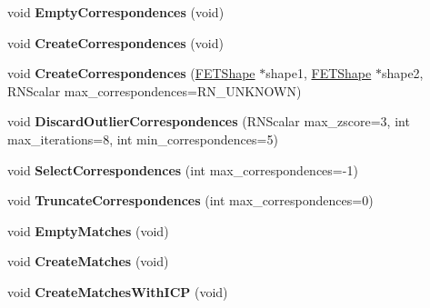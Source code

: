 \begin{DoxyCompactItemize}
\item 
void {\bfseries Empty\+Correspondences} (void)\hypertarget{struct_f_e_t_reconstruction_a63120efc07943fe20129431bf3c66680}{}\label{struct_f_e_t_reconstruction_a63120efc07943fe20129431bf3c66680}

\item 
void {\bfseries Create\+Correspondences} (void)\hypertarget{struct_f_e_t_reconstruction_a179db1cc7528ea562f4af89aa443c6aa}{}\label{struct_f_e_t_reconstruction_a179db1cc7528ea562f4af89aa443c6aa}

\item 
void {\bfseries Create\+Correspondences} (\hyperlink{struct_f_e_t_shape}{F\+E\+T\+Shape} $\ast$shape1, \hyperlink{struct_f_e_t_shape}{F\+E\+T\+Shape} $\ast$shape2, R\+N\+Scalar max\+\_\+correspondences=R\+N\+\_\+\+U\+N\+K\+N\+O\+WN)\hypertarget{struct_f_e_t_reconstruction_affcb77bf4a67b4386bc0b865f9bd4fc6}{}\label{struct_f_e_t_reconstruction_affcb77bf4a67b4386bc0b865f9bd4fc6}

\item 
void {\bfseries Discard\+Outlier\+Correspondences} (R\+N\+Scalar max\+\_\+zscore=3, int max\+\_\+iterations=8, int min\+\_\+correspondences=5)\hypertarget{struct_f_e_t_reconstruction_a910675452ef738b946c9eb438a1b0129}{}\label{struct_f_e_t_reconstruction_a910675452ef738b946c9eb438a1b0129}

\item 
void {\bfseries Select\+Correspondences} (int max\+\_\+correspondences=-\/1)\hypertarget{struct_f_e_t_reconstruction_aaed34442f5b0311c1d4a97bb2f1da822}{}\label{struct_f_e_t_reconstruction_aaed34442f5b0311c1d4a97bb2f1da822}

\item 
void {\bfseries Truncate\+Correspondences} (int max\+\_\+correspondences=0)\hypertarget{struct_f_e_t_reconstruction_ad2167710f8bdae0c65260dd36f7d21a3}{}\label{struct_f_e_t_reconstruction_ad2167710f8bdae0c65260dd36f7d21a3}

\item 
void {\bfseries Empty\+Matches} (void)\hypertarget{struct_f_e_t_reconstruction_a2c480cb77bd0537aae683a50fa4ab1d0}{}\label{struct_f_e_t_reconstruction_a2c480cb77bd0537aae683a50fa4ab1d0}

\item 
void {\bfseries Create\+Matches} (void)\hypertarget{struct_f_e_t_reconstruction_a1553842107c32b9efb427c7d17a13b45}{}\label{struct_f_e_t_reconstruction_a1553842107c32b9efb427c7d17a13b45}

\item 
void {\bfseries Create\+Matches\+With\+I\+CP} (void)\hypertarget{struct_f_e_t_reconstruction_a714d51c593bb2385aeff213d88c79492}{}\label{struct_f_e_t_reconstruction_a714d51c593bb2385aeff213d88c79492}


\end{DoxyCompactItemize}
